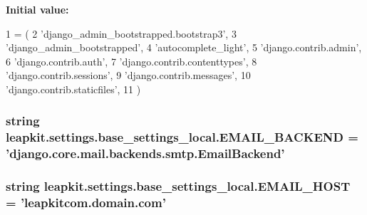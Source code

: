 {\bfseries Initial value\-:}
\begin{DoxyCode}
1 = (
2     \textcolor{stringliteral}{'django\_admin\_bootstrapped.bootstrap3'},
3     \textcolor{stringliteral}{'django\_admin\_bootstrapped'},
4     \textcolor{stringliteral}{'autocomplete\_light'},
5     \textcolor{stringliteral}{'django.contrib.admin'},
6     \textcolor{stringliteral}{'django.contrib.auth'},
7     \textcolor{stringliteral}{'django.contrib.contenttypes'},
8     \textcolor{stringliteral}{'django.contrib.sessions'},
9     \textcolor{stringliteral}{'django.contrib.messages'},
10     \textcolor{stringliteral}{'django.contrib.staticfiles'},
11 )
\end{DoxyCode}
\hypertarget{namespaceleapkit_1_1settings_1_1base__settings__local_a7359d39a05810024a7711253f8e26a76}{
\subsubsection[{E\-M\-A\-I\-L\-\_\-\-B\-A\-C\-K\-E\-N\-D}]{\setlength{\rightskip}{0pt plus 5cm}string leapkit.\-settings.\-base\-\_\-settings\-\_\-local.\-E\-M\-A\-I\-L\-\_\-\-B\-A\-C\-K\-E\-N\-D = 'django.\-core.\-mail.\-backends.\-smtp.\-Email\-Backend'}}\label{namespaceleapkit_1_1settings_1_1base__settings__local_a7359d39a05810024a7711253f8e26a76}
\hypertarget{namespaceleapkit_1_1settings_1_1base__settings__local_ab64709d2d9e59a62ad755808776f4d6f}{
\subsubsection[{E\-M\-A\-I\-L\-\_\-\-H\-O\-S\-T}]{\setlength{\rightskip}{0pt plus 5cm}string leapkit.\-settings.\-base\-\_\-settings\-\_\-local.\-E\-M\-A\-I\-L\-\_\-\-H\-O\-S\-T = 'leapkitcom.\-domain.\-com'}}\label{namespaceleapkit_1_1settings_1_1base__settings__local_ab64709d2d9e59a62ad755808776f4d6f}
